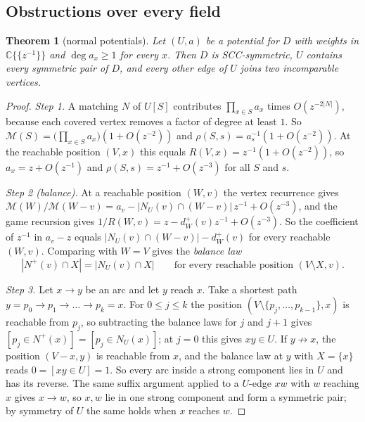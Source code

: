 \documentclass[11pt]{amsart}
\theoremstyle{plain}
\newtheorem{theorem}{Theorem}[section]
\theoremstyle{definition}
\theoremstyle{remark}
\numberwithin{equation}{section}
\newcommand{\CC}{\mathbb{C}}
\newcommand{\Mpot}{\mathcal{M}}           %
\newcommand{\nplus}{N^{+}}
\begin{document}
\subsection{Obstructions over every field}

\begin{theorem}[normal potentials]\label{thm:normal}
Let $(U,a)$ be a potential for $D$ with weights in $\CC\{\!\{z^{-1}\}\!\}$ and $\deg a_x\ge1$ for every $x$. Then $D$ is SCC-symmetric, $U$ contains every symmetric pair of $D$, and every other edge of $U$ joins two incomparable vertices.
\end{theorem}
\begin{proof}
\emph{Step 1.} A matching $N$ of $U[S]$ contributes $\prod_{x\in S}a_x$ times $O(z^{-2|N|})$, because each covered vertex removes a factor of degree at least $1$. So $\Mpot(S)=\bigl(\prod_{x\in S}a_x\bigr)(1+O(z^{-2}))$ and $\rho(S,s)=a_s^{-1}(1+O(z^{-2}))$. At the reachable position $(V,x)$ this equals $R(V,x)=z^{-1}(1+O(z^{-2}))$, so $a_x=z+O(z^{-1})$ and $\rho(S,s)=z^{-1}+O(z^{-3})$ for all $S$ and $s$.

\emph{Step 2 (balance).} At a reachable position $(W,v)$ the vertex recurrence gives $\Mpot(W)/\Mpot(W-v)=a_v-|N_U(v)\cap(W-v)|\,z^{-1}+O(z^{-3})$, and the game recursion gives $1/R(W,v)=z-d^{+}_W(v)z^{-1}+O(z^{-3})$. So the coefficient of $z^{-1}$ in $a_v-z$ equals $|N_U(v)\cap(W-v)|-d^{+}_W(v)$ for every reachable $(W,v)$. Comparing with $W=V$ gives the \emph{balance law}
\[
|\nplus(v)\cap X|=|N_U(v)\cap X|\qquad\text{for every reachable position }(V\setminus X,v).
\]

\emph{Step 3.} Let $x\to y$ be an arc and let $y$ reach $x$. Take a shortest path $y=p_0\to p_1\to\dots\to p_k=x$. For $0\le j\le k$ the position $(V\setminus\{p_j,\dots,p_{k-1}\},x)$ is reachable from $p_j$, so subtracting the balance laws for $j$ and $j+1$ gives $[p_j\in\nplus(x)]=[p_j\in N_U(x)]$; at $j=0$ this gives $xy\in U$. If $y\not\to x$, the position $(V-x,y)$ is reachable from $x$, and the balance law at $y$ with $X=\{x\}$ reads $0=[xy\in U]=1$. So every arc inside a strong component lies in $U$ and has its reverse. The same suffix argument applied to a $U$-edge $xw$ with $w$ reaching $x$ gives $x\to w$, so $x,w$ lie in one strong component and form a symmetric pair; by symmetry of $U$ the same holds when $x$ reaches $w$.
\end{proof}
\end{document}
